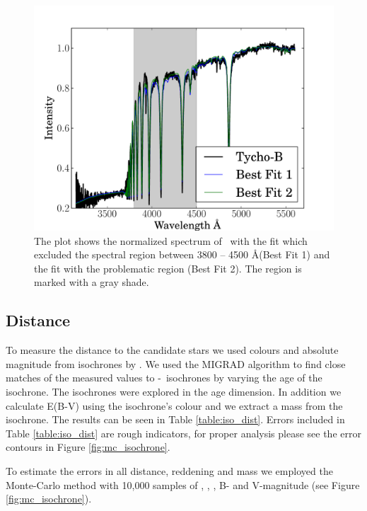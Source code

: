 \begin{figure}[h!]

\includegraphics[width=1.\textwidth]{chapter3/plots/starb_spec_comp.pdf} 

\caption{The plot shows the normalized spectrum of \starb\ with the fit which excluded the spectral region between 3800 -- 4500 \AA (Best Fit 1) and the fit with the problematic region (Best Fit 2). The region is marked with a gray shade.  }
\label{fig:starb_spec_comp}
\end{figure}

\subsection{Distance}
\label{sec:distance}
To measure the distance to the candidate stars we used colours and absolute magnitude from isochrones by  \citet{2004ApJ...612..168P}. We used the MIGRAD algorithm  \citep{James:1975dr} to find close matches of the measured values to \teff-\logg\ isochrones by varying the age of the isochrone. The isochrones were explored in the age dimension. In addition we calculate E(B-V) using the isochrone's colour and we extract a mass from the isochrone. The results can be seen in Table \ref{table:iso_dist}. Errors included in Table \ref{table:iso_dist} are rough indicators, for proper analysis please see the error contours in Figure \ref{fig:mc_isochrone}.

To estimate the errors in all distance, reddening and mass we employed the Monte-Carlo method with 10,000 samples of \teff, \logg, \feh, B- and V-magnitude (see Figure \ref{fig:mc_isochrone}). 

